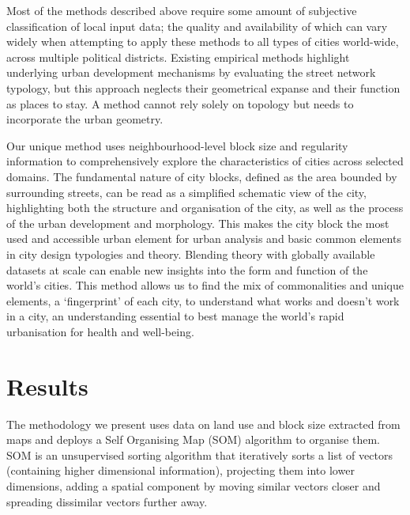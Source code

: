\documentclass[9pt,twocolumn,twoside,lineno]{pnas-new}
\begin{document}
Most of the methods described above require some amount of subjective classification of local input data; the quality and availability of which can vary widely when attempting to apply these methods to all types of cities world-wide, across multiple political districts. Existing empirical methods highlight underlying urban development mechanisms by evaluating the street network typology\cite{Hillier1989}, but this approach neglects their geometrical expanse and their function as places to stay. A method cannot rely solely on topology but needs to incorporate the urban geometry\cite{Louf2014a}.

Our unique method uses neighbourhood-level block size and regularity information to comprehensively explore the characteristics of cities across selected domains. The fundamental nature of city blocks, defined as the area bounded by surrounding streets, can be read as a simplified schematic view of the city\cite{Southworth2013}, highlighting both the structure and organisation of the city, as well as the process of the urban development and morphology. This makes the city block the most used and accessible urban element for urban analysis and basic common elements in city design typologies and theory\cite{Jacobs1961,Ewing2010,Louf2014a}. Blending theory with globally available datasets at scale can enable new insights into the form and function of the world's cities. This method allows us to find the mix of commonalities and unique elements, a `fingerprint' of each city, to understand what works and doesn't work in a city, an understanding essential to best manage the world's rapid urbanisation for health and well-being.

\section*{Results}


The methodology we present uses data on land use and block size extracted from maps and deploys a Self Organising Map (SOM) algorithm to organise them. SOM is an unsupervised sorting algorithm that iteratively sorts a list of vectors (containing higher dimensional information), projecting them into lower dimensions, adding a spatial component by moving similar vectors closer and spreading dissimilar vectors further away.
\end{document}
